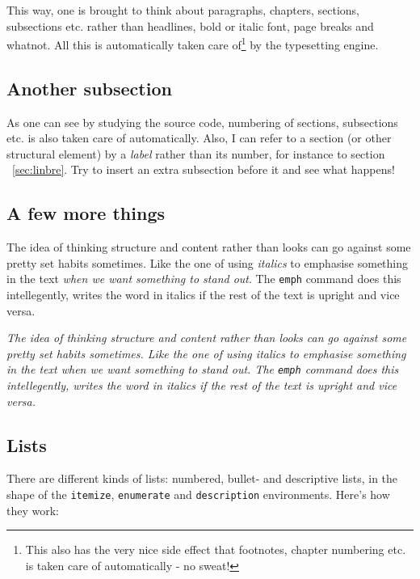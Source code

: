 \documentclass[a4paper, 11pt]{article} %
\begin{document}

This way, one is brought to think about paragraphs, chapters, sections,
subsections etc. rather than headlines, bold or italic font, page breaks and
whatnot. All this is automatically taken care of\footnote{This also has the
very nice side effect that footnotes, chapter numbering etc. is taken care of
automatically - no sweat!} by the typesetting engine.


\subsection{Another subsection}

As one can see by studying the source code, numbering of sections, subsections
etc. is also taken care of automatically. Also, I can refer to a section (or
other structural element) by a \emph{label} rather than its number, for
instance to section ~\ref{sec:linbre}. Try to insert an extra subsection before
it and see what happens!

\subsection{A few more things}

The idea of thinking structure and content rather than looks can go against some
pretty set habits sometimes. Like the one of using \textit{italics} to emphasise
something in the text \emph{when we want something to
stand out}. The \texttt{emph} command does this intellegently,
writes the word in italics if the rest of the text is upright and vice versa.


\textit{
The idea of thinking structure and content rather than looks can go against some
pretty set habits sometimes. Like the one of using \textit{italics} to emphasise
something in the text \emph{when we want something to
stand out}. The \texttt{emph} command does this intellegently,
writes the word in italics if the rest of the text is upright and vice versa.}

\subsection{Lists}

There are different kinds of lists: numbered, bullet- and descriptive
lists, in the shape of the \texttt{itemize}, \texttt{enumerate} and
\texttt{description} environments. Here's how they work:
\end{document}
